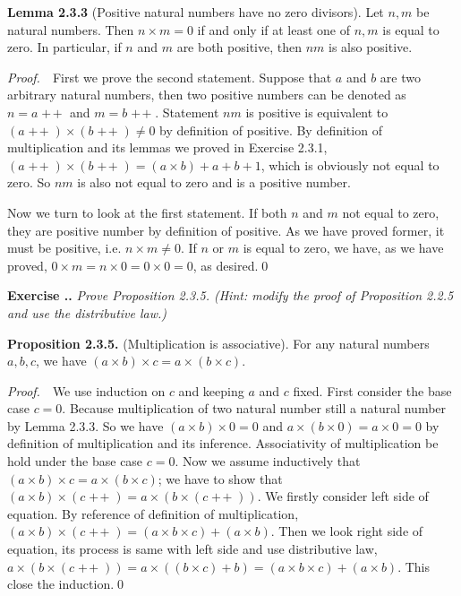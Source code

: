\documentclass{book}
\DeclareMathOperator{\tadd}{+\!+}%
\newcommand{\pff}{\vspace{.25em}\noindent\emph{Proof.}~~}
\newcommand{\titl}[1]{\noindent\textbf{#1}}
\newcounter{Exercise}[section]
\renewcommand{\theExercise}{\thesection.\arabic{Exercise}.}
\newcommand{\new}{\vspace{1.5em}\noindent\textbf{{Exercise \stepcounter{Exercise}\textbf{\theExercise}}} }
\begin{document}
\begin{framed}
\titl{Lemma 2.3.3} (Positive natural numbers have no zero divisors). Let $n,m$ be natural numbers. Then $n\times m=0$ if and only if at least one of $n,m$ is equal to zero. In particular, if $n$ and $m$ are both positive, then $nm$ is also positive.
\end{framed}

\pff First we prove the second statement. Suppose that $a$ and $b$ are two arbitrary natural numbers, then two positive numbers can be denoted as $n=a\tadd$ and $m=b\tadd$. Statement $nm$ is positive is equivalent to $(a\tadd)\times(b\tadd)\neq 0$ by definition of positive. By definition of multiplication and its lemmas we proved in Exercise 2.3.1, $(a\tadd)\times(b\tadd)=(a\times b)+a+b+1$, which is obviously not equal to zero. So $nm$ is also not equal to zero and is a positive number.

Now we turn to look at the first statement. If both $n$ and $m$ not equal to zero, they are positive number by definition of positive. As we have proved former, it must be positive, i.e. $n\times m\ne0$. If $n$ or $m$ is equal to zero, we have, as we have proved, $0\times m=n\times 0=0\times 0=0$, as desired.\qed

\new\emph{Prove Proposition 2.3.5. (Hint: modify the proof of Proposition 2.2.5 and use the distributive law.)}

\begin{framed}
\titl{Proposition 2.3.5.} (Multiplication is associative). For any natural numbers $a,b,c$, we have $(a\times b)\times c=a\times (b\times c)$.
\end{framed}

\pff We use induction on $c$ and keeping $a$ and $c$ fixed. First consider the base case $c=0$. Because multiplication of two natural number still a natural number by Lemma 2.3.3. So we have $(a\times b)\times 0=0$ and $a\times(b\times 0)=a\times 0=0$ by definition of multiplication and its inference. Associativity of multiplication be hold under the base case $c=0$. Now we assume inductively that $ (a\times b)\times c=a\times(b\times c)$; we have to show that $(a\times b)\times(c\tadd)=a\times(b\times(c\tadd))$. We firstly consider left side of equation. By reference of definition of multiplication, $(a\times b)\times(c\tadd)=(a\times b\times c)+(a\times b)$. Then we look right side of equation, its process is same with left side and use distributive law, $a\times(b\times(c\tadd))=a\times((b\times c)+b)=(a\times b\times c)+(a\times b)$. This close the induction.\qed 
\end{document}
